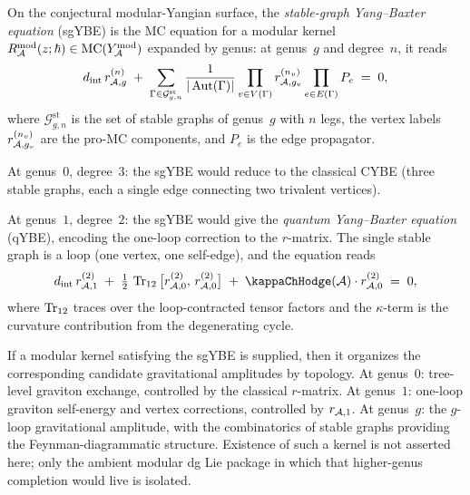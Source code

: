 \begin{definition}
On the conjectural modular-Yangian surface, the
\emph{stable-graph Yang--Baxter equation} (sgYBE) is the MC
equation for a modular kernel
$R^{\mathrm{mod}}_{\mathcal{A}}(z;\hbar)\in\mathrm{MC}(Y^{\mathrm{mod}}_{\mathcal{A}})$ expanded by genus:
at genus~$g$ and degree~$n$, it reads
\begin{equation}%
d_{\mathrm{int}}\,r_{\cA,g}^{(n)}
\;+\;
\sum_{\Gamma \in \mathcal{G}^{\mathrm{st}}_{g,n}}
\frac{1}{|\Aut(\Gamma)|}
\prod_{v \in V(\Gamma)} r_{\cA,g_v}^{(n_v)}
\prod_{e \in E(\Gamma)} P_e
\;=\; 0,
\end{equation}
where $\mathcal{G}^{\mathrm{st}}_{g,n}$ is the set of stable
graphs of genus~$g$ with $n$ legs, the vertex labels $r_{\mathcal{A},g_v}^{(n_v)}$
are the pro-MC components, and $P_e$ is the edge propagator.

At genus~$0$, degree~$3$: the sgYBE would reduce to the classical
CYBE (three stable graphs, each a single edge connecting two
trivalent vertices).

At genus~$1$, degree~$2$: the sgYBE would give the
\emph{quantum Yang--Baxter equation} (qYBE), encoding the
one-loop correction to the $r$-matrix. The single stable graph
is a loop (one vertex, one self-edge), and the equation reads
\begin{equation}%
d_{\mathrm{int}}\,r_{\cA,1}^{(2)}
\;+\;
\tfrac{1}{2}\,\Tr_{12}\,
\bigl[r_{\cA,0}^{(2)},\,r_{\cA,0}^{(2)}\bigr]
\;+\;
\kappaChHodge(\cA) \cdot r_{\cA,0}^{(2)}
\;=\; 0,
\end{equation}
where $\operatorname{Tr}_{12}$ traces over the loop-contracted tensor factors and
the $\kappa$-term is the curvature contribution from the degenerating
cycle.
\end{definition}

\begin{remark}
If a modular kernel satisfying the sgYBE is supplied, then it
organizes the corresponding candidate gravitational amplitudes by
topology. At genus~$0$: tree-level graviton exchange, controlled by
the classical $r$-matrix. At genus~$1$: one-loop graviton
self-energy and vertex corrections, controlled by $r_{\mathcal{A},1}$.
At genus~$g$: the $g$-loop gravitational amplitude, with the
combinatorics of stable graphs providing the Feynman-diagrammatic
structure. Existence of such a
kernel is not asserted here; only the ambient modular dg Lie package
in which that higher-genus completion would live is isolated.
\end{remark}

